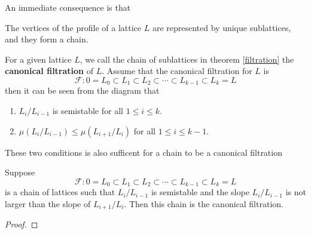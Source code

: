 An immediate consequence is that 
\begin{theorem}\label{filtration}
    The vertices of the profile of a lattice $L$ are represented by unique sublattices, and they form a chain.
\end{theorem}
For a given lattice $L$, we call the chain of sublattices in theorem \ref{filtration} the \textbf{canonical filtration} of $L$. Assume that the canonical filtration for $L$ 
is 
\[\mathcal{F}: 0 = L_0 \subset L_1 \subset L_2 \subset \cdots \subset L_{k-1} \subset L_k = L \]
then it can be seen from the diagram that 
\begin{enumerate}
    \item $L_i/L_{i-1}$ is semistable for all $1 \le i \le k$.
    \item $\mu(L_i/L_{i-1}) \le \mu(L_{i+1}/L_i)$ for all $1 \le i \le k-1$.
\end{enumerate}
These two conditions is also sufficent for a chain to be a canonical filtration
\begin{theorem}\label{Grayson's criterion}
Suppose
\[\mathcal{F}: 0 = L_0 \subset L_1 \subset L_2 \subset \cdots \subset L_{k-1} \subset L_k = L \]
is a chain of lattices such that $L_i/L_{i-1}$ is semistable and the slope $L_i/L_{i-1}$ is not larger than the slope of $L_{i+1}/L_i$. 
Then this chain is the canonical filtration.
\end{theorem}
\begin{figure}[ht]
    \centering
    \caption{}
    \label{figure34}
\end{figure}
\begin{proof}

\end{proof}
